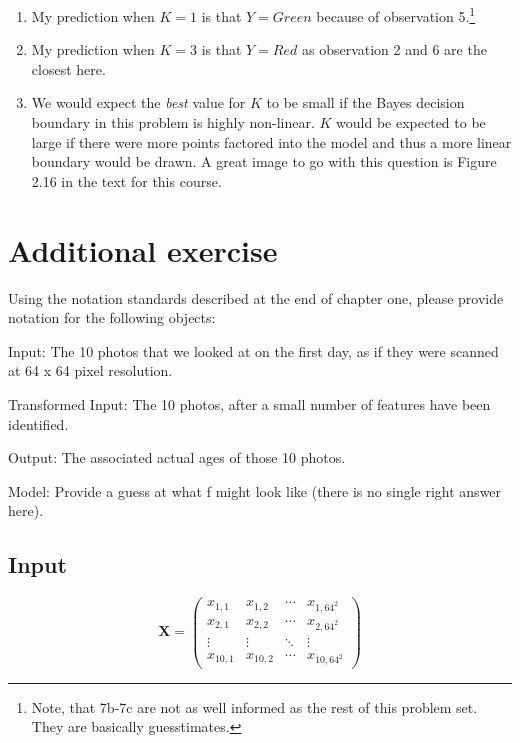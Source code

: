 \documentclass[11pt]{article}
\begin{document}
\begin{enumerate}
\begin{enumerate}
      \item My prediction when $K = 1$ is that $Y = Green$ because of observation 5.\footnote{Note, that 7b-7c are not as well informed as the rest of this problem set. They are basically guesstimates.}
      \item My prediction when $K = 3$ is that $Y = Red$ as observation 2 and 6 are the closest here.
      \item We would expect the \emph{best} value for $K$ to be small if the Bayes decision boundary in this problem is highly non-linear. $K$ would be expected to be large if there were more points factored into the model and thus a more linear boundary would be drawn. A great image to go with this question is Figure 2.16 in the text for this course.
    \end{enumerate}

\end{enumerate}



\section*{Additional exercise}


Using the notation standards described at the end of chapter one, please provide notation for the following objects:

Input: The 10 photos that we looked at on the first day, as if they were scanned at 64 x 64 pixel resolution.

Transformed Input: The 10 photos, after a small number of features have been identified.

Output: The associated actual ages of those 10 photos.

Model: Provide a guess at what f might look like (there is no single right answer here).

\subsection*{Input}

$$ \mathbf{X} = 
  \begin{pmatrix}
    x_{1,1}  & x_{1,2}  & \cdots & x_{1, 64^2} \\
    x_{2,1}  & x_{2,2}  & \cdots & x_{2, 64^2} \\
    \vdots   & \vdots   & \ddots & \vdots  \\
    x_{10,1} & x_{10,2} & \cdots & x_{10, 64^2} 
\end{pmatrix} $$
\end{document}
